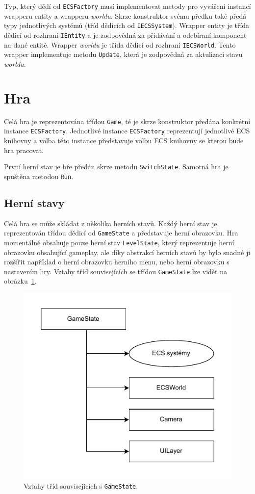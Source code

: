 Typ, který dědí od \texttt{ECSFactory} musí implementovat metody pro vyváření instancí wrapperu entity a wrapperu \textit{worldu}. Skrze konstruktor svému předku také předá typy jednotlivých systémů (tříd dědicích od \texttt{IECSSystem}). Wrapper entity je třída dědicí od rozhraní \texttt{IEntity} a je zodpovědná za přidávání a odebíraní komponent na dané entitě. Wrapper \textit{worldu} je třída dědicí od rozhraní \texttt{IECSWorld}. Tento wrapper implementuje metodu \texttt{Update}, která je zodpovědná za aktulizaci stavu \textit{worldu}.

\section{Hra}
Celá hra je reprezentována třídou \texttt{Game}, té je skrze konstruktor předána konkrétní instance \texttt{ECSFactory}. Jednotlivé instance \texttt{ECSFactory} reprezentují jednotlivé ECS knihovny a volba této instance představuje volbu ECS knihovny se kterou bude hra pracovat.

První herní stav je hře předán skrze metodu \texttt{SwitchState}. Samotná hra je spuštěna metodou \texttt{Run}.

\subsection{Herní stavy}
Celá hra se může skládat z několika herních stavů. Každý herní stav je reprezentován třídou dědicí od \texttt{GameState} a představuje herní obrazovku. Hra momentálně obsahuje pouze herní stav \texttt{LevelState}, který reprezentuje herní obrazovku obsahující gameplay, ale díky abstrakcí herních stavů by bylo snadné ji rozšířit například o herní obrazovku herního menu, nebo herní obrazovku s nastavením hry. Vztahy tříd souvisejících se třídou \texttt{GameState} lze vidět na obrázku~\ref{fig:game-state}.

\begin{figure}[!htb]
  \centering
  \includegraphics[width=0.5\linewidth]{img/game-state.pdf}
  \caption{Vztahy tříd souvisejících s \texttt{GameState}.}
  \label{fig:game-state}
\end{figure}

